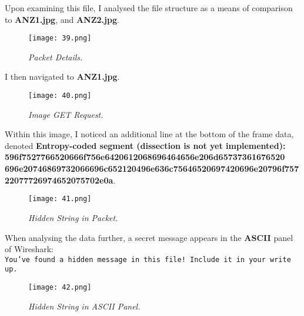 Upon examining this file, I analysed the file structure as a means of comparison to \textbf{ANZ1.jpg}, and \textbf{ANZ2.jpg}.

\begin{figure}[H]
    \setlength{\abovecaptionskip}{20pt}
    \setlength{\belowcaptionskip}{0pt}
    \centering
    \texttt{[image: 39.png]}
    \captionsetup{justification=centering}
    \caption{\textit{Packet Details.}}
    \label{fig:39}
\end{figure}
\vspace{-10pt}

I then navigated to \textbf{ANZ1.jpg}.

\begin{figure}[H]
    \setlength{\abovecaptionskip}{20pt}
    \setlength{\belowcaptionskip}{0pt}
    \centering
    \texttt{[image: 40.png]}
    \captionsetup{justification=centering}
    \caption{\textit{Image GET Request.}}
    \label{fig:40}
\end{figure}
\vspace{-10pt}

Within this image, I noticed an additional line at the bottom of the frame data, denoted \textbf{Entropy-coded segment (dissection is not yet implemented): 596f7527766520666f756e6420612068696464656e206d65737361676520\\
696e20746869732066696c652120496e636c75646520697420696e20796f75722077726974652075702e0a}. 

\begin{figure}[H]
    \setlength{\abovecaptionskip}{20pt}
    \setlength{\belowcaptionskip}{0pt}
    \centering
    \texttt{[image: 41.png]}
    \captionsetup{justification=centering}
    \caption{\textit{Hidden String in Packet.}}
    \label{fig:41}
\end{figure}
\vspace{-10pt}

When analysing the data further, a secret message appears in the \textbf{ASCII} panel of Wireshark:\\
\texttt{You've found a hidden message in this file! Include it in your write up.}

\begin{figure}[H]
    \setlength{\abovecaptionskip}{20pt}
    \setlength{\belowcaptionskip}{0pt}
    \centering
    \texttt{[image: 42.png]}
    \captionsetup{justification=centering}
    \caption{\textit{Hidden String in ASCII Panel.}}
    \label{fig:42}
\end{figure}
\vspace{-10pt}


